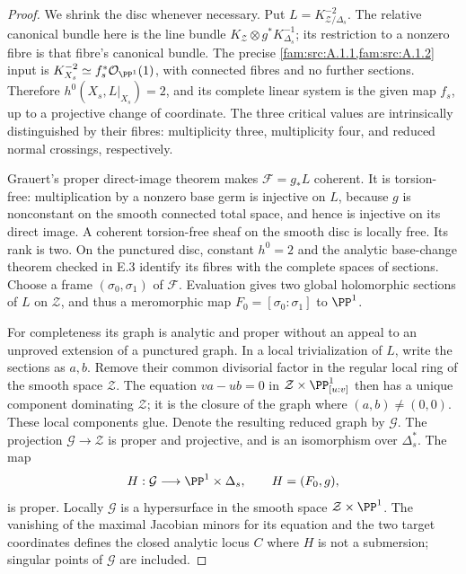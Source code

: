\begin{proof}
We shrink the disc whenever necessary. Put
$L=K_{\mathcal Z/\Delta_s}^{-2}$. The relative canonical
bundle here is the line bundle
$K_{\mathcal Z}\otimes g^*K_{\Delta_s}^{-1}$; its
restriction to a nonzero fibre is that fibre's canonical bundle.
The precise \cref{fam:src:A.1.1,fam:src:A.1.2} input is
$K_{X_s}^{-2}\simeq f_s^*\mathcal O_{\PP^1}(1)$,
with connected fibres and no further sections. Therefore
$h^0(X_s,L|_{X_s})=2$, and its complete linear system is
the given map $f_s$, up to a projective change of coordinate.
The three critical values are intrinsically distinguished by
their fibres: multiplicity three, multiplicity four, and reduced
normal crossings, respectively.

Grauert's proper direct-image theorem
\citep[Section 6, Hauptsatz I]{Grauert1960D} makes
$\mathcal F=g_*L$ coherent. It is torsion-free: multiplication
by a nonzero base germ is injective on $L$, because $g$ is
nonconstant on the smooth connected total space, and hence is injective on
its direct image. A coherent torsion-free sheaf on the smooth
disc is locally free. Its rank is two. On the punctured disc,
constant $h^0=2$ and the analytic base-change theorem checked
in E.3 identify its fibres with the complete spaces of sections.
Choose a frame $(\sigma_0,\sigma_1)$ of $\mathcal F$.
Evaluation gives two global holomorphic sections of $L$ on
$\mathcal Z$, and thus a meromorphic map
$F_0=[\sigma_0:\sigma_1]$ to $\PP^1$.

For completeness its graph is analytic and proper without an
appeal to an unproved extension of a punctured graph. In a local
trivialization of $L$, write the sections as $a,b$. Remove their
common divisorial factor in the regular local ring of the smooth
space $\mathcal Z$. The equation
$v a-u b=0$ in $\mathcal Z\times\PP^1_{[u:v]}$
then has a unique component dominating $\mathcal Z$; it is
the closure of the graph where $(a,b)\ne(0,0)$. These local
components glue. Denote the resulting reduced graph by
$\mathcal G$. The projection $\mathcal G\to\mathcal Z$
is proper and projective, and is an isomorphism over
$\Delta_s^*$. The map
\[
 H:\mathcal G\longrightarrow\PP^1\times\Delta_s,
 \qquad H=(F_0,g),
\]
is proper. Locally $\mathcal G$ is a hypersurface in the smooth
space $\mathcal Z\times\PP^1$. The vanishing of the maximal
Jacobian minors for its equation and the two target coordinates
defines the closed analytic locus $C$ where $H$ is not a
submersion; singular points of $\mathcal G$ are included.


\end{proof}
